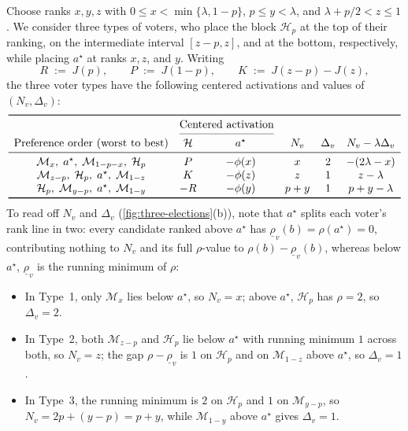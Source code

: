 \documentclass[11pt]{article}
\numberwithin{equation}{section}
\theoremstyle{plain}
\theoremstyle{definition}
\newcommand{\1}{\mathbf{1}}
\newcommand{\lowrho}{\underline{\rho}}
\newcommand{\calH}{\mathcal{H}}
\newcommand{\calM}{\mathcal{M}}
\begin{document}
Choose ranks $x, y, z$ with $0 \le x < \min\{\lambda, 1 - p\}$, $p \le y < \lambda$, and $\lambda + p/2 < z \le 1$. We consider three types of voters, who place the block $\calH_p$ at the top of their ranking, on the intermediate interval $[z - p, z]$, and at the bottom, respectively, while placing $a^\star$ at ranks $x, z$, and $y$. Writing
\[
  R \;:=\; J(p),
  \qquad
  P \;:=\; J(1 - p),
  \qquad
  K \;:=\; J(z - p) - J(z),
\]
the three voter types have the following centered activations and values of $(N_v, \Delta_v)$:
\[
  \begin{array}{cccccc}
    \toprule
    & \multicolumn{2}{c}{\text{Centered activation}} & & & \\
    \cmidrule(lr){2-3}
    \text{Preference order (worst to best)} & \calH & a^\star & N_v & \Delta_v & N_v - \lambda\Delta_v \\
    \midrule
    \calM_x,\; a^\star,\; \calM_{1-p-x},\; \calH_p & P & -\phi(x) & x & 2 & -(2\lambda - x) \\
    \calM_{z-p},\; \calH_p,\; a^\star,\; \calM_{1-z} & K & -\phi(z) & z & 1 & z - \lambda \\
    \calH_p,\; \calM_{y-p},\; a^\star,\; \calM_{1-y} & -R & -\phi(y) & p + y & 1 & p + y - \lambda \\
    \bottomrule
  \end{array}
\]
To read off $N_v$ and $\Delta_v$ (\cref{fig:three-elections}(b)), note that $a^\star$ splits each voter's rank line in two: every candidate ranked above $a^\star$ has $\lowrho_v(b) = \rho(a^\star) = 0$, contributing nothing to $N_v$ and its full $\rho$-value to $\rho(b) - \lowrho_v(b)$, whereas below $a^\star$, $\lowrho_v$ is the running minimum of $\rho$:
\begin{itemize}
  \item In Type~1, only $\calM_x$ lies below $a^\star$, so $N_v = x$; above $a^\star$, $\calH_p$ has $\rho = 2$, so $\Delta_v = 2$.
  \item In Type~2, both $\calM_{z-p}$ and $\calH_p$ lie below $a^\star$ with running minimum $1$ across both, so $N_v = z$; the gap $\rho - \lowrho_v$ is $1$ on $\calH_p$ and on $\calM_{1-z}$ above $a^\star$, so $\Delta_v = 1$.
  \item In Type~3, the running minimum is $2$ on $\calH_p$ and $1$ on $\calM_{y-p}$, so $N_v = 2p + (y - p) = p + y$, while $\calM_{1-y}$ above $a^\star$ gives $\Delta_v = 1$.
\end{itemize}
\end{document}
